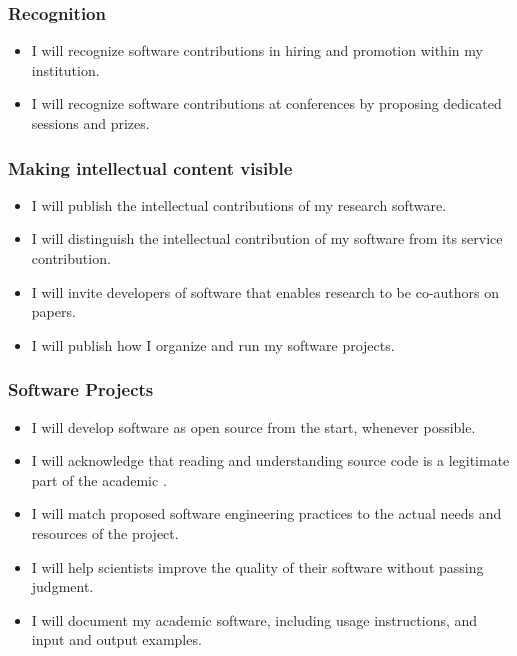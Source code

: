 \documentclass[a4paper,UKenglish]{dagman}
\renewcommand{\paragraph}[1]{\subsubsection*{#1}\xspace}
\begin{document}
\paragraph{Recognition}
\begin{itemize}
\item I will recognize software contributions in hiring and promotion within my institution.
\item I will recognize software contributions at conferences by proposing dedicated sessions and prizes.
\end{itemize}

\paragraph{Making intellectual content visible}
\begin{itemize}
\item I will publish the intellectual contributions of my research software.
\item I will distinguish the intellectual contribution of my software from its service contribution.
\item I will invite developers of software that enables research to be co-authors on papers.
\item I will publish how I organize and run my software projects.
\end{itemize}

\paragraph{Software Projects}
\begin{itemize}
\item I will develop software as open source from the start, whenever possible.
\item I will acknowledge that reading and understanding source code is a legitimate part of the academic .
\item I will match proposed software engineering practices to the actual needs and resources of the project.
\item I will help scientists improve the quality of their software without passing judgment.
\item I will document my academic software, including usage instructions, and input and output examples.
\end{itemize}
\end{document}
